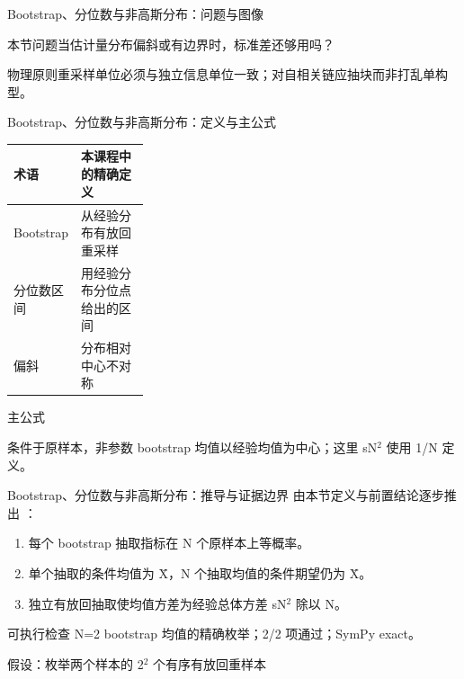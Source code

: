 \begin{frame}[t]{Bootstrap、分位数与非高斯分布：问题与图像}
\footnotesize
\begin{block}{本节问题}当估计量分布偏斜或有边界时，标准差还够用吗？\end{block}
\begin{block}{物理原则}\quad 重采样单位必须与独立信息单位一致；对自相关链应抽块而非打乱单构型。\end{block}
\end{frame}

\begin{frame}[t]{Bootstrap、分位数与非高斯分布：定义与主公式}
\footnotesize\begin{tabularx}{\linewidth}{p{0.30\linewidth}Y}
\toprule 术语 & 本课程中的精确定义\\\midrule
{} Bootstrap & 从经验分布有放回重采样\\
 分位数区间 & 用经验分布分位点给出的区间\\
 偏斜 & 分布相对中心不对称\\
\bottomrule\end{tabularx}\vspace{0.15cm}
\begin{block}{ 主公式}\centering{}\end{block}
条件于原样本，非参数 bootstrap 均值以经验均值为中心；这里 sN\ensuremath{^{2}} 使用 1/\allowbreak{}N 定义。
\end{frame}

\begin{frame}[t]{Bootstrap、分位数与非高斯分布：推导与证据边界}
\footnotesize
{}\quad 由本节定义与前置结论逐步推出 ：
\begin{enumerate}
\item 每个 bootstrap 抽取指标在 N 个原样本上等概率。
\item 单个抽取的条件均值为 X̄，N 个抽取均值的条件期望仍为 X̄。
\item 独立有放回抽取使均值方差为经验总体方差 sN\ensuremath{^{2}} 除以 N。
\end{enumerate}\begin{block}{可执行检查}
\quad N=2 bootstrap 均值的精确枚举；2/2 项通过；SymPy exact。
\par\scriptsize 假设：枚举两个样本的 2\ensuremath{^{2}} 个有序有放回重样本
\end{block}
\end{frame}

